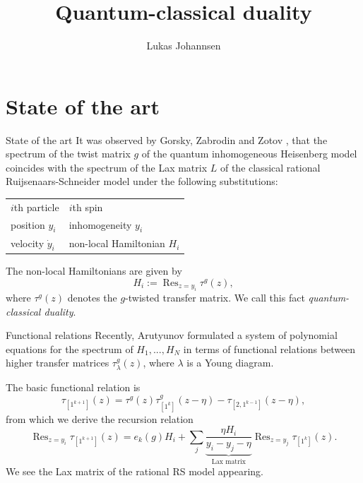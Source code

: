 \documentclass[11pt]{beamer}
\author{Lukas Johannsen}
\title{Quantum-classical duality}
\institute{University of Hamburg}
\theoremstyle{remark}
\theoremstyle{remark}
\begin{document}
\begin{frame}
\titlepage
\end{frame}


\section{State of the art}

\begin{frame}{State of the art}
It was observed by Gorsky, Zabrodin and Zotov \cite{article:gorsky:2014}, that the spectrum of the twist matrix $g$ of the quantum inhomogeneous Heisenberg model coincides with the spectrum of the Lax matrix $L$ of the classical rational Ruijsenaars-Schneider model under the following substitutions:

\begin{center}
\begin{tabular}{|l||l|}
\hline
$i$th particle & $i$th spin \\
position $y_i$ & inhomogeneity $y_i$ \\
velocity $\dot y_i$ & non-local Hamiltonian $H_i$ \\
\hline
\end{tabular}
\end{center}
The non-local Hamiltonians are given by
\begin{equation*}
H_i := \operatorname{Res}_{z=y_i} \tau^g(z),
\end{equation*}
where $\tau^g(z)$ denotes the $g$-twisted transfer matrix. We call this fact \emph{quantum-classical duality}.
\end{frame}

\begin{frame}{Functional relations}
Recently, Arutyunov \cite{book:arutyunov:betheAnsatz} formulated a system of polynomial equations for the spectrum of $H_1,...,H_N$ in terms of functional relations between higher transfer matrices $\tau_\lambda^g(z)$, where $\lambda$ is a Young diagram.

The basic functional relation is
\begin{equation*}
\tau_{[1^{k+1}]}(z) = \tau^g(z) \tau_{[1^k]}^g(z-\eta) - \tau_{[2,1^{k-1}]}(z-\eta),
\end{equation*}
from which we derive the recursion relation
\begin{equation*}
\operatorname{Res}_{z=y_i} \tau_{[1^{k+1}]}(z) = e_k(g) H_i + \sum_j \underset{\text{Lax matrix}}{\underbrace{\frac{\eta H_i}{y_i-y_j-\eta}}} \operatorname{Res}_{z=y_j} \tau_{[1^k]}(z).
\end{equation*}
We see the Lax matrix of the rational RS model appearing.
\end{frame}
\end{document}

